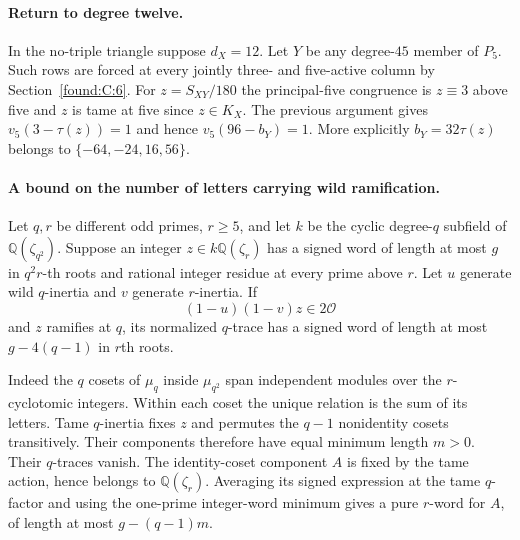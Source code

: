 \documentclass[11pt,a4paper]{article}
\numberwithin{equation}{section}
\theoremstyle{remark}
\begin{document}
\paragraph{Return to degree twelve.}
In the no-triple triangle suppose $d_X=12$. Let $Y$ be any degree-$45$ member of $P_5$. Such rows are forced at every jointly three- and five-active column by Section~\ref{found:C:6}. For $z=S_{XY}/180$ the principal-five congruence is $z\equiv3$ above five and $z$ is tame at five since $z\in K_X$. The previous argument gives $v_5(3-\tau(z))=1$ and hence $v_5(96-b_Y)=1$. More explicitly $b_Y=32\tau(z)$ belongs to $\{-64,-24,16,56\}$.

\paragraph{A bound on the number of letters carrying wild ramification.}
Let $q,r$ be different odd primes, $r\ge5$, and let $k$ be the cyclic degree-$q$ subfield of $\mathbb Q(\zeta_{q^2})$. Suppose an integer $z\in k\mathbb Q(\zeta_r)$ has a signed word of length at most $g$ in $q^2r$-th roots and rational integer residue at every prime above $r$. Let $u$ generate wild $q$-inertia and $v$ generate $r$-inertia. If
\[
                  (1-u)(1-v)z\in2\mathcal O
\]
and $z$ ramifies at $q$, its normalized $q$-trace has a signed word of length at most $g-4(q-1)$ in $r$th roots.

Indeed the $q$ cosets of $\mu_q$ inside $\mu_{q^2}$ span independent modules over the $r$-cyclotomic integers. Within each coset the unique relation is the sum of its letters. Tame $q$-inertia fixes $z$ and permutes the $q-1$ nonidentity cosets transitively. Their components therefore have equal minimum length $m>0$. Their $q$-traces vanish. The identity-coset component $A$ is fixed by the tame action, hence belongs to $\mathbb Q(\zeta_r)$. Averaging its signed expression at the tame $q$-factor and using the one-prime integer-word minimum gives a pure $r$-word for $A$, of length at most $g-(q-1)m$.
\end{document}
